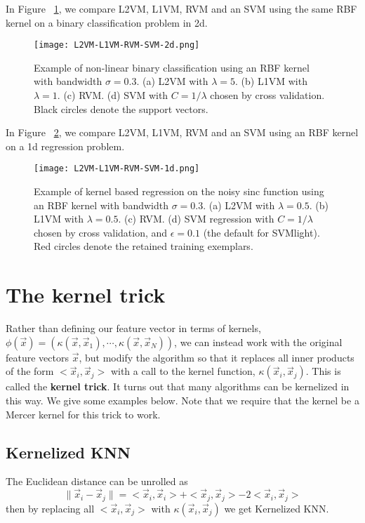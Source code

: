 In Figure ~\ref{fig:L2VM-L1VM-RVM-SVM-2d}, we compare L2VM, L1VM, RVM and an SVM using the same RBF kernel on a binary classification problem in 2d.

\begin{figure}[hbtp]
\centering
    \texttt{[image: L2VM-L1VM-RVM-SVM-2d.png]}
\caption{Example of non-linear binary classification using an RBF kernel with bandwidth $\sigma=0.3$. (a) L2VM with $\lambda=5$. (b) L1VM with $\lambda=1$. (c) RVM. (d) SVM with $C=1/\lambda$ chosen by cross validation. Black circles denote the support vectors.}
\label{fig:L2VM-L1VM-RVM-SVM-2d} 
\end{figure}

In Figure ~\ref{fig:L2VM-L1VM-RVM-SVM-1d}, we compare L2VM, L1VM, RVM and an SVM using an RBF kernel on a 1d regression problem. 
\begin{figure}[hbtp]
\centering
    \texttt{[image: L2VM-L1VM-RVM-SVM-1d.png]}
\caption{Example of kernel based regression on the noisy sinc function using an RBF kernel with bandwidth $\sigma=0.3$. (a) L2VM with $\lambda=0.5$. (b) L1VM with $\lambda=0.5$. (c) RVM. (d) SVM regression with $C=1/\lambda$ chosen by cross validation, and $\epsilon=0.1$ (the default for SVMlight). Red circles denote the retained training exemplars.}
\label{fig:L2VM-L1VM-RVM-SVM-1d} 
\end{figure}


\section{The kernel trick}
Rather than defining our feature vector in terms of kernels, $\phi(\vec{x})=(\kappa(\vec{x},\vec{x}_1),\cdots,\kappa(\vec{x},\vec{x}_N))$, we can instead work with the original feature vectors $\vec{x}$, but modify the algorithm so that it replaces all inner products of the form $<\vec{x}_i,\vec{x}_j>$ with a call to the kernel function, $\kappa(\vec{x}_i,\vec{x}_j)$. This is called the \textbf{kernel trick}. It turns out that many algorithms can be kernelized in this way. We give some examples below. Note that we require that the kernel be a Mercer kernel for this trick to work.


\subsection{Kernelized KNN}
The Euclidean distance can be unrolled as
\begin{equation}\label{eqn:Euclidean-distance}
\lVert\vec{x}_i-\vec{x}_j\rVert=<\vec{x}_i,\vec{x}_i>+<\vec{x}_j,\vec{x}_j>-2<\vec{x}_i,\vec{x}_j>
\end{equation}
then by replacing all $<\vec{x}_i,\vec{x}_j>$ with $\kappa(\vec{x}_i,\vec{x}_j)$ we get Kernelized KNN.


